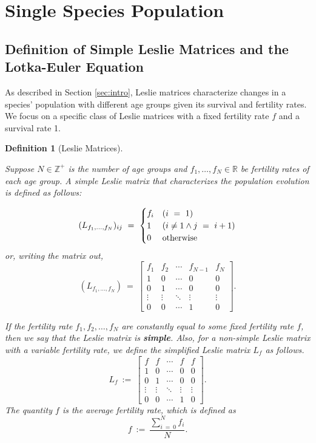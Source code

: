 \documentclass[11pt,reqno]{amsart}
\numberwithin{equation}{section}
\theoremstyle{plain}
\newtheorem{definition}[thm]{Definition}
\begin{document}
\section{Single Species Population}\label{sec:single}


\subsection{Definition of Simple Leslie Matrices and the Lotka-Euler Equation}

As described in Section \ref{sec:intro}, Leslie matrices characterize changes in a species' population with different age groups given its survival and fertility rates. We focus on a specific class of Leslie matrices with a fixed fertility rate $f$ and a survival rate 1. 

\begin{definition}[Leslie Matrices]
    \label{LeslieDef}

    Suppose $N \in \mathbb{Z}^+$ is the number of age groups and $f_1, \dots, f_N \in \mathbb R$ be fertility rates of each age group. A simple Leslie matrix that 
    characterizes the population evolution is defined as follows:

    \[
        (L_{f_1, \dots, f_N})_{ij} \ =\ \begin{cases}
            f_i & (i \ = \  1)\\
            1 & (i \neq 1 \wedge j\ = \ i+1)\\
            0 & \rm {otherwise}\\
        \end{cases}
    \]
        or, writing the matrix out, 
    \[(L_{f_1, \dots, f_N}) \ = \ 
    \begin{bmatrix}
        f_1 & f_2& \cdots & f_{N - 1} & f_N\\ 
        1 & 0 & \cdots & 0 & 0 \\
        0 & 1 & \cdots & 0 & 0\\
        \vdots & \vdots & \ddots & \vdots & \vdots\\
        0 & 0 &\cdots & 1 & 0
    \end{bmatrix}.
    \]

    If the fertility rate $f_1, f_2, \dots, f_N$ are constantly equal to some fixed fertility rate $f$, then we say that the Leslie matrix is \textbf{simple}. Also, for a non-simple Leslie matrix with a variable fertility rate, we define the simplified Leslie matrix $L_f$ as follows. 
    \[L_f \ := \ 
    \begin{bmatrix}
        f & f& \cdots & f & f\\ 
        1 & 0 & \cdots & 0 & 0 \\
        0 & 1 & \cdots & 0 & 0\\
        \vdots & \vdots & \ddots & \vdots & \vdots\\
        0 & 0 &\cdots & 1 & 0
    \end{bmatrix}. 
    \]
    The quantity $f$ is the average fertility rate, which is defined as
    \[
        f \ := \ \frac {\sum_{i \ = \  0}^N f_i} N. 
    \]
    
\end{definition}
\end{document}
